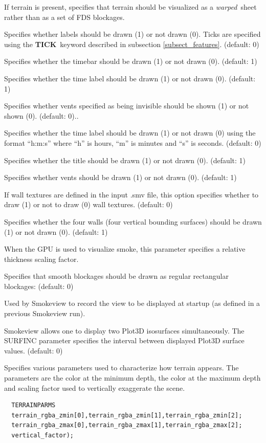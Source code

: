 \documentclass[11pt,twoside]{book}
\newcommand{\hitem}[1]{\item[{\bf #1} \hfill]}
\begin{document}
\hitem{SHOWTERRAIN} If terrain is present, specifies that terrain should be visualized as a {\em warped}\ sheet
rather than as a set of FDS blockages.

\hitem{SHOWTICKS} Specifies whether labels should be drawn (1) or
not drawn (0).  Ticks are specified using the {\bf TICK}\ keyword
described in subsection \ref{subsect_features}. (default: 0)

\hitem{SHOWTIMEBAR}Specifies whether the timebar should be drawn
(1) or not drawn (0). (default: 1)

\hitem{SHOWTIMELABEL} Specifies whether the time label should be
drawn (1) or not drawn (0). (default: 1)

\hitem{SHOWTRANSPARENTVENTS} Specifies whether vents specified as being invisible should be
shown (1) or not shown (0). (default: 0)..

\hitem{SHOWHMSTIMELABEL}Specifies whether the time label should be
drawn (1) or not drawn (0) using the format ``h:m:s'' where ``h''
is hours, ``m'' is minutes and ``s'' is seconds.  (default: 0)

\hitem{SHOWTITLE}Specifies whether
the title should be drawn (1) or not drawn (0).
(default: 1)

\hitem{SHOWVENTS} Specifies whether vents should be drawn
(1) or not drawn (0).  (default: 1)

\hitem{SHOWALLTEXTURES} If wall textures are defined in the input .smv file, this
option specifies whether to draw (1) or not to draw (0) wall textures.
(default: 0)


\hitem{SHOWWALLS}Specifies whether
the four walls (four vertical bounding surfaces) should be drawn (1) or not drawn (0).
(default: 1)

\hitem{SMOKERTHICK} When the GPU is used to visualize smoke, this parameter specifies a
relative thickness scaling factor.

\hitem{SMOOTHBLOCKSOLID}  Specifies that smooth blockages should be drawn as regular rectangular blockages: (default: 0)

\hitem{STARTUPVIEW}Used by Smokeview to record the view to be
displayed at startup (as defined in a previous Smokeview run).

\hitem{SURFINC}Smokeview allows one to display two Plot3D
isosurfaces simultaneously.  The SURFINC parameter specifies the
interval between displayed Plot3D surface values. (default: 0)

\hitem{TERRAINPARMS} Specifies various parameters used to characterize
how terrain appears.  The parameters are the color at the minimum depth,
the color at the maximum depth and scaling factor used to vertically exaggerate
the scene.
\begin{lstlisting}
  TERRAINPARMS
  terrain_rgba_zmin[0],terrain_rgba_zmin[1],terrain_rgba_zmin[2];
  terrain_rgba_zmax[0],terrain_rgba_zmax[1],terrain_rgba_zmax[2];
  vertical_factor);
\end{lstlisting}
\end{document}
